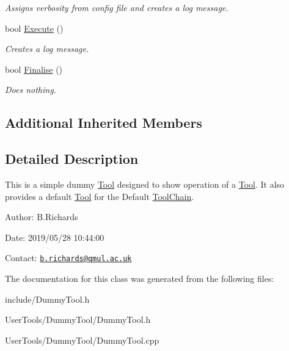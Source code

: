 \begin{DoxyCompactItemize}
\begin{DoxyCompactList}\small\item\em Assigns verbosity from config file and creates a log message. \end{DoxyCompactList}\item 
\hypertarget{classDummyTool_ac107b31f1785c1cc803e0e65be548047}{bool \hyperlink{classDummyTool_ac107b31f1785c1cc803e0e65be548047}{Execute} ()}\label{classDummyTool_ac107b31f1785c1cc803e0e65be548047}

\begin{DoxyCompactList}\small\item\em Creates a log message. \end{DoxyCompactList}\item 
\hypertarget{classDummyTool_aacb5d0b9906a27c2b4bba4aae9bc093a}{bool \hyperlink{classDummyTool_aacb5d0b9906a27c2b4bba4aae9bc093a}{Finalise} ()}\label{classDummyTool_aacb5d0b9906a27c2b4bba4aae9bc093a}

\begin{DoxyCompactList}\small\item\em Does nothing. \end{DoxyCompactList}\end{DoxyCompactItemize}
\subsection*{Additional Inherited Members}


\subsection{Detailed Description}
This is a simple dummy \hyperlink{classTool}{Tool} designed to show operation of a \hyperlink{classTool}{Tool}. It also provides a default \hyperlink{classTool}{Tool} for the Default \hyperlink{classToolChain}{Tool\-Chain}.

\begin{DoxyParagraph}{Author\-:}
B.\-Richards 
\end{DoxyParagraph}
\begin{DoxyParagraph}{Date\-:}
2019/05/28 10\-:44\-:00 
\end{DoxyParagraph}
Contact\-: \href{mailto:b.richards@qmul.ac.uk}{\tt b.\-richards@qmul.\-ac.\-uk} 

The documentation for this class was generated from the following files\-:\begin{DoxyCompactItemize}
\item 
include/Dummy\-Tool.\-h\item 
User\-Tools/\-Dummy\-Tool/Dummy\-Tool.\-h\item 
User\-Tools/\-Dummy\-Tool/Dummy\-Tool.\-cpp\end{DoxyCompactItemize}
